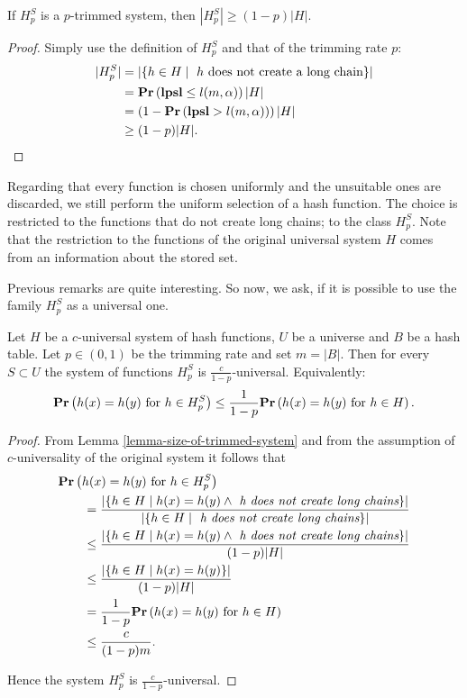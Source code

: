 \begin{lemma}
\label{lemma-size-of-trimmed-system}
If $H_p^S$ is a $p$-trimmed system, then $|H_p^S| \geq (1 - p)|H|$.
\end{lemma}
\begin{proof}
Simply use the definition of $H_p^S$ and that of the trimming rate $p$:
\[
\begin{split}
|H_p^S|
	& = |\lbrace h \in H \mid \text{ $h$ does not create a long chain} \rbrace| \\
	& =\mathbf{Pr}\left(\mathbf{lpsl} \leq l(m, \alpha)\right) |H| \\
	& = \left(1 - \mathbf{Pr}\left(\mathbf{lpsl} > l(m, \alpha)\right)\right) |H| \\
	& \geq (1 - p)|H| \text{.}
\end{split}
\]
\end{proof}

Regarding that every function is chosen uniformly and the unsuitable ones are discarded, we still perform the uniform selection of a hash function. The choice is restricted to the functions that do not create long chains; to the class $H_p^S$. Note that the restriction to the functions of the original universal system $H$ comes from an information about the stored set.

Previous remarks are quite interesting. So now, we ask, if it is possible to use the family $H_p^S$ as a universal one.
\begin{theorem}
\label{theorem-p-trimmed-is-universal}
Let $H$ be a $c$-universal system of hash functions, $U$ be a universe and $B$ be a hash table. Let $p \in (0, 1)$ be the trimming rate and set $m = |B|$. Then for every $S \subset U$ the system of functions $H_p^S$ is $\frac{c}{1 - p}$-universal. Equivalently:
\[
	\mathbf{Pr}\left(h(x) = h(y) \text{ for } h \in H_p^S\right) \leq \frac{1}{1 - p} \mathbf{Pr}\left(h(x) = h(y) \text{ for } h \in H\right) \text{.}
\]
\end{theorem}
\begin{proof}
From Lemma \ref{lemma-size-of-trimmed-system} and from the assumption of $c$-universality of the original system it follows that 
\[
\begin{split}
& \mathbf{Pr}\left(h(x) = h(y) \text{ for } h \in H_p^S\right)  \\
	& \qquad =  \frac{|\{ h \in H \mid h(x) = h(y) \wedge \textit{ h does not create long chains} \}|}{|\lbrace h \in H \mid \textit{ h does not create long chains} \rbrace|} \\
	& \qquad \leq \frac{|\{ h \in H \mid h(x) = h(y) \wedge \textit{ h does not create long chains} \}|}{(1 - p)|H|} \\ 
	& \qquad \leq \frac{|\{ h \in H \mid h(x) = h(y) \}|}{(1 - p)|H|} \\
	& \qquad = \frac{1}{1 - p} \mathbf{Pr}\left(h(x) = h(y) \text{ for } h \in H\right) \\
	& \qquad \leq \frac{c}{(1 - p) m} \text{.}
\end{split}
\]

Hence the system $H_p^S$ is $\frac{c}{1 - p}$-universal.
\end{proof}

